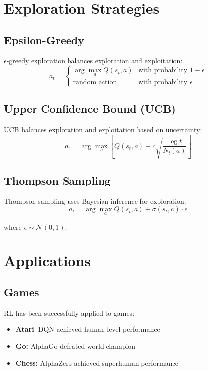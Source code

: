 \section{Exploration Strategies}

\subsection{Epsilon-Greedy}

$\epsilon$-greedy exploration balances exploration and exploitation:
\begin{equation}
    a_t = \begin{cases}
        \arg\max_a Q(s_t,a) & \text{with probability } 1-\epsilon \\
        \text{random action} & \text{with probability } \epsilon
    \end{cases}
\end{equation}

\subsection{Upper Confidence Bound (UCB)}

UCB balances exploration and exploitation based on uncertainty:
\begin{equation}
    a_t = \arg\max_a \left[Q(s_t,a) + c\sqrt{\frac{\log t}{N_t(a)}}\right]
\end{equation}

\subsection{Thompson Sampling}

Thompson sampling uses Bayesian inference for exploration:
\begin{equation}
    a_t = \arg\max_a Q(s_t,a) + \sigma(s_t,a) \cdot \epsilon
\end{equation}

where $\epsilon \sim \mathcal{N}(0,1)$.

\section{Applications}

\subsection{Games}

RL has been successfully applied to games:
\begin{itemize}
    \item \textbf{Atari:} DQN achieved human-level performance
    \item \textbf{Go:} AlphaGo defeated world champion
    \item \textbf{Chess:} AlphaZero achieved superhuman performance
\end{itemize}

